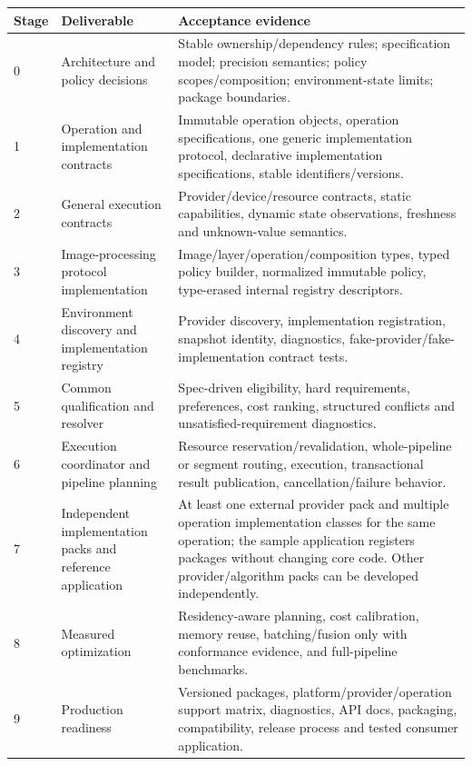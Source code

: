 \documentclass[11pt,a4paper,oneside]{article}
\begin{document}
\begin{longtable}{@{}L{0.085\textwidth}L{0.24\textwidth}Z{0.60\textwidth}@{}}
\toprule
\textbf{Stage} & \textbf{Deliverable} & \textbf{Acceptance evidence} \\
 & Architecture and policy decisions & Stable ownership/dependency rules; specification model; precision semantics; policy scopes/composition; environment-state limits; package boundaries. \\
1 & Operation and implementation contracts & Immutable operation objects, operation specifications, one generic implementation protocol, declarative implementation specifications, stable identifiers/versions. \\
2 & General execution contracts & Provider/device/resource contracts, static capabilities, dynamic state observations, freshness and unknown-value semantics. \\
3 & Image-processing protocol implementation & Image/layer/operation/composition types, typed policy builder, normalized immutable policy, type-erased internal registry descriptors. \\
4 & Environment discovery and implementation registry & Provider discovery, implementation registration, snapshot identity, diagnostics, fake-provider/fake-implementation contract tests. \\
5 & Common qualification and resolver & Spec-driven eligibility, hard requirements, preferences, cost ranking, structured conflicts and unsatisfied-requirement diagnostics. \\
6 & Execution coordinator and pipeline planning & Resource reservation/revalidation, whole-pipeline or segment routing, execution, transactional result publication, cancellation/failure behavior. \\
7 & Independent implementation packs and reference application & At least one external provider pack and multiple operation implementation classes for the same operation; the sample application registers packages without changing core code. Other provider/algorithm packs can be developed independently. \\
8 & Measured optimization & Residency-aware planning, cost calibration, memory reuse, batching/fusion only with conformance evidence, and full-pipeline benchmarks. \\
9 & Production readiness & Versioned packages, platform/provider/operation support matrix, diagnostics, API docs, packaging, compatibility, release process and tested consumer application. \\
\bottomrule
\end{longtable}
\end{document}
